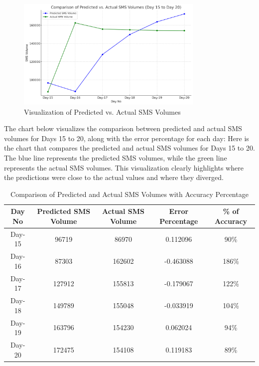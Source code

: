 \documentclass[12pt]{book} %
\begin{document}
\begin{figure}[h]
	\begin{center}
		\includegraphics[width=0.8\textwidth]{assets/result-predicted-vs-actual-sms-balance.png} 
	\end{center}
	\caption{Visualization of Predicted vs. Actual SMS Volumes} %
	\label{fig:result-predicted-vs-actual-sms-balance}
\end{figure}


The chart below visualizes the comparison between predicted and actual SMS volumes for Days 15 to 20, along with the error percentage for each day:
Here is the chart that compares the predicted and actual SMS volumes for Days 15 to 20. The blue line represents the predicted SMS volumes, while the green line represents the actual SMS volumes. This visualization clearly highlights where the predictions were close to the actual values and where they diverged.



\begin{table}[ht]
    \centering
    \caption{Comparison of Predicted and Actual SMS Volumes with Accuracy Percentage}
    \begin{adjustbox}{max width=\textwidth}
    \begin{tabular}{|c|c|c|c|c|}
    \hline
    \rowcolor{lightgray} \textbf{Day No} & \textbf{Predicted SMS Volume} & \textbf{Actual SMS Volume} & \textbf{Error Percentage} & \textbf{\% of Accuracy} \\
    \hline
    Day-15 & 96719 & 86970 & 0.112096 & 90\% \\
    \hline
    Day-16 & 87303 & 162602 & -0.463088 & 186\% \\
    \hline
    Day-17 & 127912 & 155813 & -0.179067 & 122\% \\
    \hline
    Day-18 & 149789 & 155048 & -0.033919 & 104\% \\
    \hline
    Day-19 & 163796 & 154230 & 0.062024 & 94\% \\
    \hline
    Day-20 & 172475 & 154108 & 0.119183 & 89\% \\
    \hline
    \end{tabular}
    \end{adjustbox}
    \label{tab:comparison}
\end{table}
\end{document}
